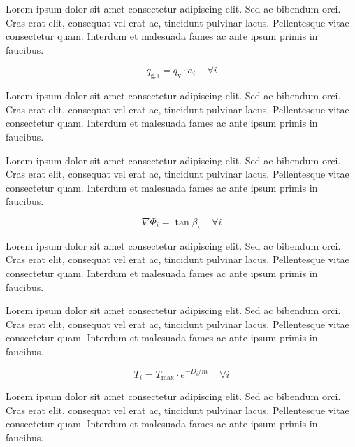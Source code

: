 \documentclass[./main.tex]{subfiles}
\begin{document}
\par Lorem ipsum dolor sit amet consectetur adipiscing elit. Sed ac bibendum orci. Cras erat elit, consequat vel erat ac, tincidunt pulvinar lacus. Pellentesque vitae consectetur quam. Interdum et malesuada fames ac ante ipsum primis in faucibus.
\begin{linenomath*}
\begin{equation}
\label{eq:topmodel:prem1}
q_{\text{g}, i} = q_{\text{v}} \cdot a_{i}  \quad \, \forall i
\end{equation}
\end{linenomath*}
Lorem ipsum dolor sit amet consectetur adipiscing elit. Sed ac bibendum orci. Cras erat elit, consequat vel erat ac, tincidunt pulvinar lacus. Pellentesque vitae consectetur quam. Interdum et malesuada fames ac ante ipsum primis in faucibus.

\par Lorem ipsum dolor sit amet consectetur adipiscing elit. Sed ac bibendum orci. Cras erat elit, consequat vel erat ac, tincidunt pulvinar lacus. Pellentesque vitae consectetur quam. Interdum et malesuada fames ac ante ipsum primis in faucibus.
\begin{linenomath*}
\begin{equation}
\label{eq:topmodel:prem2}
\nabla \Phi_{i} = \tan \beta_{i} \quad \, \forall i
\end{equation}
\end{linenomath*}
Lorem ipsum dolor sit amet consectetur adipiscing elit. Sed ac bibendum orci. Cras erat elit, consequat vel erat ac, tincidunt pulvinar lacus. Pellentesque vitae consectetur quam. Interdum et malesuada fames ac ante ipsum primis in faucibus.


\par Lorem ipsum dolor sit amet consectetur adipiscing elit. Sed ac bibendum orci. Cras erat elit, consequat vel erat ac, tincidunt pulvinar lacus. Pellentesque vitae consectetur quam. Interdum et malesuada fames ac ante ipsum primis in faucibus.
\begin{linenomath*}
\begin{equation}
\label{eq:topmodel:prem3}
T_{i} = T_{\text{max}} \cdot e^{-D_{i}/m}  \quad \, \forall i
\end{equation}
\end{linenomath*}
Lorem ipsum dolor sit amet consectetur adipiscing elit. Sed ac bibendum orci. Cras erat elit, consequat vel erat ac, tincidunt pulvinar lacus. Pellentesque vitae consectetur quam. Interdum et malesuada fames ac ante ipsum primis in faucibus.
\end{document}
